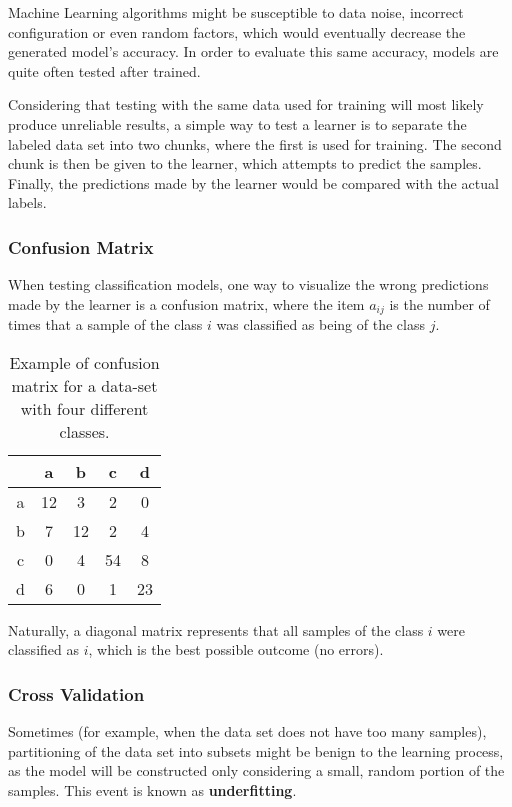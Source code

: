 Machine Learning algorithms might be susceptible to data noise, incorrect configuration or even random factors, which would eventually decrease the generated model's accuracy. In order to evaluate this same accuracy, models are quite often tested after trained.

Considering that testing with the same data used for training will most likely produce unreliable results, a simple way to test a learner is to separate the labeled data set into two chunks, where the first is used for training. The second chunk is then be given to the learner, which attempts to predict the samples. Finally, the predictions made by the learner would be compared with the actual labels.

\subsubsection{Confusion Matrix}

When testing classification models, one way to visualize the wrong predictions made by the learner is a confusion matrix, where the item $a_{ij}$ is the number of times that a sample of the class $i$ was classified as being of the class $j$.

\begin{table}[H]
	\centering
	\begin{tabular}{ |c || *{4}{c|} }
		\hline
           &   a &   b &   c &   d \\\hline\hline
		a & 12 &   3 &   2 &   0 \\
		b &   7 & 12 &   2 &   4 \\
		c &   0 &   4 & 54 &   8 \\
		d &   6 &   0 &   1 & 23 \\\hline
	\end{tabular}

	\caption{Example of confusion matrix for a data-set with four different classes.}
\end{table}

Naturally, a diagonal matrix represents that all samples of the class $i$ were classified as $i$, which is the best possible outcome (no errors).

\subsubsection{Cross Validation}

Sometimes (for example, when the data set does not have too many samples), partitioning of the data set into subsets might be benign to the learning process, as the model will be constructed only considering a small, random portion of the samples. This event is known as \textbf{underfitting}.


